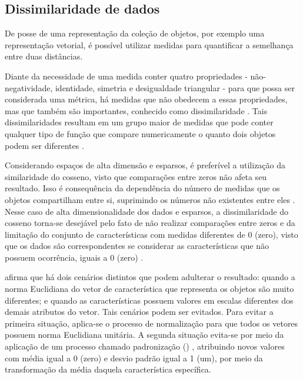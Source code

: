 		\subsection{Dissimilaridade de dados}  %
		\label{subsec:dissimilaridade}
			De posse de uma representação da coleção de objetos, por exemplo uma representação
			vetorial, é possível utilizar medidas para quantificar a semelhança entre duas
			distâncias.
		
			Diante da necessidade de uma medida conter quatro propriedades - não-negatividade,
			identidade, simetria e desigualdade triangular - para que possa ser considerada
			uma métrica, há medidas que não obedecem a essas propriedades, mas que também
			são importantes, conhecido como dissimilaridade \cite{phd:paulovich}. Tais
			dissimilaridades resultam em um grupo maior de medidas que pode conter qualquer
			tipo de função que compare numericamente o quanto dois objetos podem ser
			diferentes \cite{Tan:2005:IDM:1095618}.
			
			Considerando espaços de alta dimensão e esparsos, é preferível a utilização da
			similaridade do cosseno, visto que comparações entre zeros não afeta
			seu resultado. Isso é consequência da dependência do número de medidas que os
			objetos compartilham entre si, suprimindo os números não existentes entre
			eles \cite{phd:paulovich}. Nesse caso de alta dimensionalidade dos dados e
			esparsos, a dissimilaridade do cosseno torna-se desejável pelo fato de não
			realizar comparações entre zeros e da limitação do conjunto de características
			com medidas diferentes de 0 (zero), visto que os dados são correspondentes se
			considerar as características que não possuem ocorrência, iguais a $0$
			(zero) \cite{Tan:2005:IDM:1095618}.
			
			 afirma que há dois cenários distintos que podem
			adulterar o resultado: quando a norma Euclidiana do vetor de característica
			que representa os objetos são muito diferentes; e quando as características
			possuem valores em escalas diferentes dos demais
			atributos do vetor. Tais cenários podem ser evitados. Para evitar a primeira
			situação, aplica-se o processo de normalização para que todos os vetores possuem
			norma Euclidiana unitária. A segunda situação evita-se por meio da
			aplicação de um processo chamado padronização ()
			\cite{Tan:2005:IDM:1095618}, atribuindo novos valores com média igual a 0 (zero)
			e desvio padrão igual a 1 (um), por meio da transformação da média daquela
			característica específica.
			
